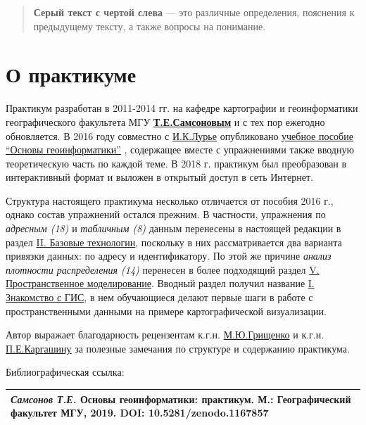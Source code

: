 \documentclass[12pt,]{book}
\begin{document}
\begin{quote}
\textbf{Серый текст с чертой слева} --- это различные определения, пояснения к предыдущему тексту, а также вопросы на понимание.
\end{quote}

\hypertarget{section-3}{%
\section*{О практикуме}\label{section-3}}

Практикум разработан в 2011-2014 гг. на кафедре картографии и геоинформатики географического факультета МГУ \href{https://istina.msu.ru/profile/tsamsonov/}{\textbf{Т.Е.Самсоновым}} и с тех пор ежегодно обновляется. В 2016 году совместно с \href{https://istina.msu.ru/profile/IK_Lurie/}{И.К.Лурье} опубликовано \href{https://istina.msu.ru/download/45821659/1ej66u:uSUtcUS-XmdMMyRRpC-yflDmCv8/}{учебное пособие ``Основы геоинформатики''} , содержащее вместе с упражнениями также вводную теоретическую часть по каждой теме. В 2018 г. практикум был преобразован в интерактивный формат и выложен в открытый доступ в сеть Интернет.

Структура настоящего практикума несколько отличается от пособия 2016 г., однако состав упражнений остался прежним. В частности, упражнения по \emph{адресным (18)} и \emph{табличным (8)} данным перенесены в настоящей редакции в раздел \protect\hyperlink{map-ref-general}{II. Базовые технологии}, поскольку в них рассматривается два варианта привязки данных: по адресу и идентификатору. По этой же причине \emph{анализ плотности распределения (14)} перенесен в более подходящий раздел \protect\hyperlink{density-analysis}{V. Пространственное моделирование}. Вводный раздел получил название \protect\hyperlink{map-design-quaternary}{I. Знакомство с ГИС}, в нем обучающиеся делают первые шаги в работе с пространственными данными на примере картографической визуализации.

Автор выражает благодарность рецензентам к.г.н. \href{https://istina.msu.ru/profile/sila_trakt/}{М.Ю.Грищенко} и к.г.н. \href{https://istina.msu.ru/profile/pavelkargashin/}{П.Е.Каргашину} за полезные замечания по структуре и содержанию практикума.

Библиографическая ссылка:

\begin{longtable}[]{@{}l@{}}
\toprule
\endhead
\emph{Самсонов Т.Е.} \textbf{Основы геоинформатики: практикум}. М.: Географический факультет МГУ, 2019. DOI: 10.5281/zenodo.1167857\tabularnewline
\bottomrule
\end{longtable}
\end{document}
